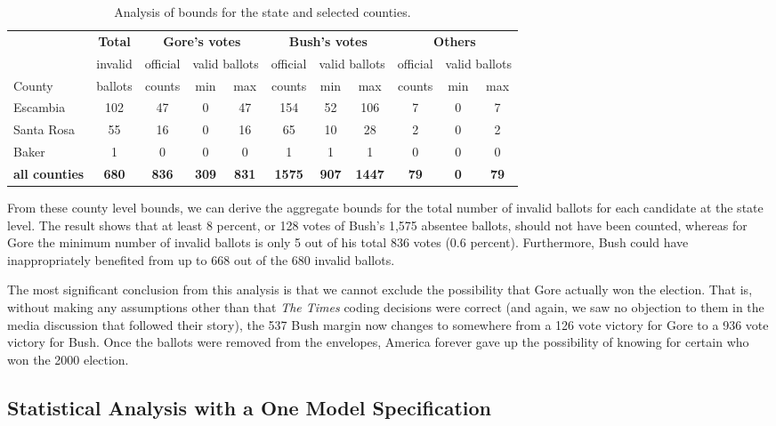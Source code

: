 \documentclass[11pt,titlepage]{article}
\begin{document}
\begin{table}[t]
\begin{center}
\begin{tabular}{l c |ccc|ccc|ccc}
    & \bf Total & \multicolumn{3}{c|}{\bf Gore's votes} &
  \multicolumn{3}{c|}{\bf Bush's votes} &
  \multicolumn{3}{c}{\bf Others} \\
  & invalid & official & \multicolumn{2}{c|}{valid ballots} & official &
  \multicolumn{2}{c|}{valid ballots} & official &
  \multicolumn{2}{c}{valid ballots} \\
County & ballots & counts & min & max & counts & min & max & counts &
  min & max\\
\hline 
Escambia   & 102 & 47 & 0 & 47 & 154 & 52 & 106 & 7 & 0 & 7 \\
Santa Rosa &  55 & 16 & 0 & 16 &  65 & 10 &  28 & 2 & 0 & 2 \\
Baker      &  1  &  0 & 0 &  0 &   1 &  1 &   1 & 0 & 0 & 0 \\
\hline
\bf all counties & \bf 680 & \bf 836 & \bf 309 & \bf 831 & \bf 1575 &
  \bf 907 & \bf 1447 & \bf 79 & \bf 0 & \bf 79 \\ 
\end{tabular} \caption{Analysis of bounds for the state  and 
  selected counties.}\label{tb:bounds}
\end{center}
\end{table} 

From these county level bounds, we can derive the aggregate bounds for
the total number of invalid ballots for each candidate at the state
level. The result shows that at least 8 percent, or 128 votes of
Bush's 1,575 absentee ballots, should not have been counted, whereas
for Gore the minimum number of invalid ballots is only 5 out of his
total 836 votes (0.6 percent).  Furthermore, Bush could have
inappropriately benefited from up to 668 out of the 680 invalid
ballots.

The most significant conclusion from this analysis is that we cannot
exclude the possibility that Gore actually won the election.  That is,
without making any assumptions other than that \emph{The Times} coding
decisions were correct (and again, we saw no objection to them in the
media discussion that followed their story), the 537 Bush margin now
changes to somewhere from a 126 vote victory for Gore to a 936 vote
victory for Bush.  Once the ballots were removed from the envelopes,
America forever gave up the possibility of knowing for certain who won
the 2000 election.

\subsection{Statistical Analysis with a One Model Specification} \label{s:onemodel}
\end{document}
